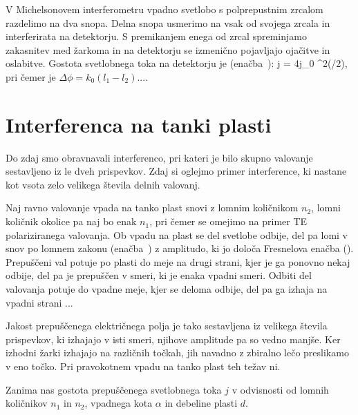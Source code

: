 V Michelsonovem interferometru vpadno svetlobo s polprepustnim zrcalom razdelimo 
na dva snopa. Delna snopa usmerimo na  vsak od svojega zrcala in interferirata na detektorju. S premikanjem enega od zrcal spreminjamo
zakasnitev med žarkoma in na detektorju se izmenično pojavljajo ojačitve in oslabitve.
Gostota svetlobnega toka na detektorju je (enačba~):
\beq
j = 4j_0 \cos^2(\Delta \phi/2),
\label{eq:06_24}
\eeq
pri čemer je $\Delta \phi = k_0(l_1-l_2)$....


\section{Interferenca na tanki plasti}
Do zdaj smo obravnavali interferenco, pri kateri je bilo skupno valovanje sestavljeno iz le 
dveh prispevkov. Zdaj si oglejmo primer interference, ki nastane kot vsota zelo velikega 
števila delnih valovanj. 

Naj ravno valovanje vpada na tanko plast snovi z lomnim količnikom $n_2$, lomni količnik 
okolice pa naj bo enak $n_1$, pri čemer se omejimo na primer TE polariziranega valovanja.
Ob vpadu na plast se del svetlobe odbije, del pa lomi v snov po lomnem zakonu (enačba~) 
z amplitudo, ki jo določa Fresnelova enačba (). Prepuščeni val potuje po plasti do meje
na drugi strani, kjer je ga ponovno nekaj odbije, del pa je prepuščen v smeri, ki 
je enaka vpadni smeri. Odbiti del valovanja potuje 
do vpadne meje, kjer se deloma odbije, del pa ga izhaja na vpadni strani ... 

Jakost prepuščenega električnega polja je tako sestavljena iz velikega števila prispevkov, ki 
izhajajo v isti smeri, njihove amplitude pa so vedno manjše. Ker izhodni žarki 
izhajajo na različnih točkah, jih navadno z zbiralno lečo preslikamo v eno točko. Pri pravokotnem
vpadu na tanko plast teh težav ni. 

Zanima nas gostota prepuščenega svetlobnega toka $j$ v odvisnosti od 
lomnih količnikov $n_1$ in $n_2$, vpadnega kota $\alpha$ in debeline plasti $d$. 


